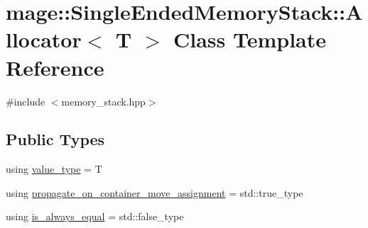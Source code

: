 \hypertarget{classmage_1_1_single_ended_memory_stack_1_1_allocator}{}\section{mage\+:\+:Single\+Ended\+Memory\+Stack\+:\+:Allocator$<$ T $>$ Class Template Reference}
\label{classmage_1_1_single_ended_memory_stack_1_1_allocator}


{\ttfamily \#include $<$memory\+\_\+stack.\+hpp$>$}

\subsection*{Public Types}
\begin{DoxyCompactItemize}
\item 
using \mbox{\hyperlink{classmage_1_1_single_ended_memory_stack_1_1_allocator_a1dafabb56c4b51ad6bfc19769f48c8be}{value\+\_\+type}} = T
\item 
using \mbox{\hyperlink{classmage_1_1_single_ended_memory_stack_1_1_allocator_a299eaeb1bc7cdc17f58deefb8e334f34}{propagate\+\_\+on\+\_\+container\+\_\+move\+\_\+assignment}} = std\+::true\+\_\+type
\item 
using \mbox{\hyperlink{classmage_1_1_single_ended_memory_stack_1_1_allocator_aa62e1b505ea8f83a4f3014b0242e124f}{is\+\_\+always\+\_\+equal}} = std\+::false\+\_\+type
\end{DoxyCompactItemize}
